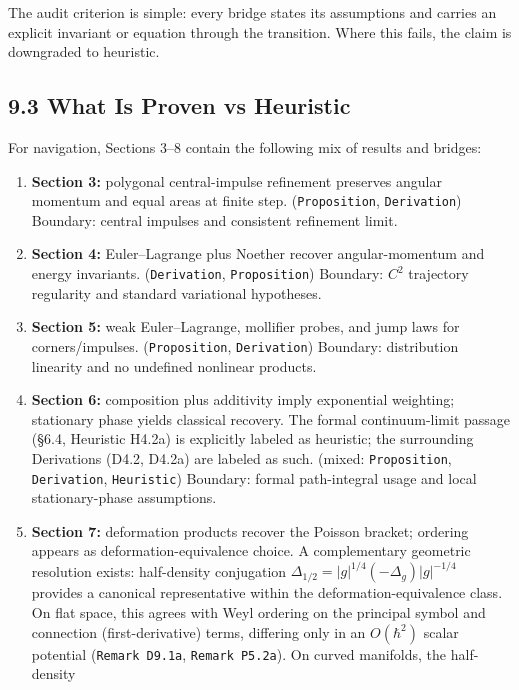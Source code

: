 \documentclass[
]{article}
\begin{document}
The audit criterion is simple: every bridge states its assumptions and
carries an explicit invariant or equation through the transition. Where
this fails, the claim is downgraded to heuristic.

\subsection{9.3 What Is Proven vs
Heuristic}\label{what-is-proven-vs-heuristic}

For navigation, Sections 3--8 contain the following mix of results and
bridges:

\begin{enumerate}
\def\labelenumi{\arabic{enumi}.}
\item
  \textbf{Section 3:} polygonal central-impulse refinement preserves
  angular momentum and equal areas at finite step.
  (\texttt{Proposition}, \texttt{Derivation}) Boundary: central impulses
  and consistent refinement limit.
\item
  \textbf{Section 4:} Euler--Lagrange plus Noether recover
  angular-momentum and energy invariants. (\texttt{Derivation},
  \texttt{Proposition}) Boundary: \(C^2\) trajectory regularity and
  standard variational hypotheses.
\item
  \textbf{Section 5:} weak Euler--Lagrange, mollifier probes, and jump
  laws for corners/impulses. (\texttt{Proposition}, \texttt{Derivation})
  Boundary: distribution linearity and no undefined nonlinear products.
\item
  \textbf{Section 6:} composition plus additivity imply exponential
  weighting; stationary phase yields classical recovery. The formal
  continuum-limit passage (§6.4, Heuristic H4.2a) is explicitly labeled
  as heuristic; the surrounding Derivations (D4.2, D4.2a) are labeled as
  such. (mixed: \texttt{Proposition}, \texttt{Derivation},
  \texttt{Heuristic}) Boundary: formal path-integral usage and local
  stationary-phase assumptions.
\item
  \textbf{Section 7:} deformation products recover the Poisson bracket;
  ordering appears as deformation-equivalence choice. A complementary
  geometric resolution exists: half-density conjugation
  \(\Delta_{1/2}=|g|^{1/4}(-\Delta_g)|g|^{-1/4}\) provides a canonical
  representative within the deformation-equivalence class. On flat
  space, this agrees with Weyl ordering on the principal symbol and
  connection (first-derivative) terms, differing only in an
  \(O(\hbar^2)\) scalar potential (\texttt{Remark\ D9.1a},
  \texttt{Remark\ P5.2a}). On curved manifolds, the half-density

\end{enumerate}
\end{document}
